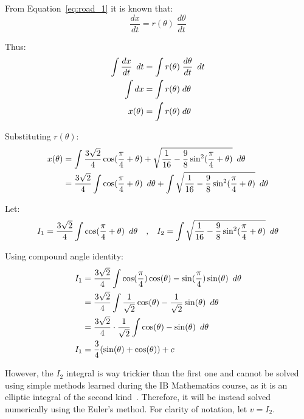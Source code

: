 \documentclass[12pt]{article}
\newcommand{\Hquad}{\hspace{0.5em}}
\begin{document}
        From Equation~\ref{eq:road_1} it is known that:
        \begin{equation}
            \frac{dx}{dt} = r(\theta) \;\frac{d\theta}{dt}
        \end{equation}

        Thus:
        \begin{align}
            \int \frac{dx}{dt} \Hquad dt &= \int r(\theta) \;\frac{d\theta}{dt} \Hquad dt \\
            \int dx &= \int r(\theta) \;d\theta \\
            x(\theta) &= \int r(\theta) \;d\theta
        \end{align}

        Substituting $r(\theta)$:
        \begin{align}
            x(\theta) &= \int \frac{3\sqrt{2}}{4} \cos (\frac{\pi}{4} + \theta) + \sqrt{\frac{1}{16} - \frac{9}{8} \sin^2 (\frac{\pi}{4}+\theta)} \Hquad d\theta \\
            &= \frac{3\sqrt{2}}{4} \int \cos (\frac{\pi}{4} + \theta) \Hquad d\theta + \int \sqrt{\frac{1}{16} - \frac{9}{8} \sin^2 (\frac{\pi}{4}+\theta)} \Hquad d\theta
        \end{align}

        Let:
        \begin{align}
            I_1 = \frac{3\sqrt{2}}{4} \int \cos (\frac{\pi}{4} + \theta) \Hquad d\theta \quad \text{,} \quad
            I_2 = \int \sqrt{\frac{1}{16} - \frac{9}{8} \sin^2 (\frac{\pi}{4}+\theta)} \Hquad d\theta
        \end{align}

        Using compound angle identity:
        \begin{align}
            I_1 &= \frac{3\sqrt{2}}{4} \int \cos (\frac{\pi}{4}) \cos(\theta) - \sin(\frac{\pi}{4}) \sin(\theta) \Hquad d\theta \\
            &= \frac{3\sqrt{2}}{4} \int \frac{1}{\sqrt{2}} \cos(\theta) - \frac{1}{\sqrt{2}} \sin(\theta) \Hquad d\theta \\
            &= \frac{3\sqrt{2}}{4} \cdot \frac{1}{\sqrt{2}} \int \cos(\theta) - \sin(\theta) \Hquad d\theta \\
            I_1 &= \frac{3}{4} (\sin(\theta) + \cos(\theta)) + c
        \end{align}

        However, the $I_2$ integral is way trickier than the first one and cannot be solved using simple methods learned during the IB Mathematics course, as it is an elliptic integral of the second kind~\cite{elliptic_integral}. Therefore, it will be instead solved numerically using the Euler's method. For clarity of notation, let $v = I_2$.
\end{document}
